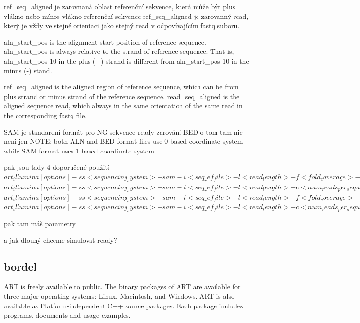 \documentclass[czech,DP]{thesiskiv}
\begin{document}
		ref\_seq\_aligned je zarovnaná oblast referenční sekvence, která může být plus vlákno nebo mínos vlákno referenční sekvence
		ref\_seq\_aligned je zarovanný read, který je vždy ve stejné orientaci jako stejný read v odpovívajícím fastq suboru.  
		
		
			    
	    
	       	
		aln\_start\_pos is the alignment start position of reference sequence. aln\_start\_pos is always relative to the strand of reference sequence. That is, aln\_start\_pos 10 in the plus (+) strand is different from aln\_start\_pos 10 in the minus (‐) stand.  
	
		ref\_seq\_aligned is the aligned region of reference sequence, which can be from plus strand or minus strand of the reference sequence. 
		read\_seq\_aligned is the aligned sequence read, which always in the same orientation of the same read in the corresponding fastq file. 

SAM je standardní formát pro NG sekvence ready zarování
BED o tom tam nic neni jen 
NOTE: both ALN and BED format files use 0-based coordinate system while SAM format uses 1-based coordinate system.

pak jsou tady 4 doporučené použití
$art_illumina [options] -ss <sequencing_system> -sam -i <seq_ref_file> -l <read_length> -f <fold_coverage> -o <outfile_prefix>$
$art_illumina [options] -ss <sequencing_system> -sam -i <seq_ref_file> -l <read_length> -c <num_reads_per_sequence> -o <outfile_prefix>$
$art_illumina [options] -ss <sequencing_system> -sam -i <seq_ref_file> -l <read_length> -f <fold_coverage> -m <mean_fragsize> -s <std_fragsize> -o <outfile_prefix>$
$art_illumina [options] -ss <sequencing_system> -sam -i <seq_ref_file> -l <read_length> -c <num_reads_per_sequence> -m <mean_fragsize> -s <std_fragsize> -o <outfile_prefix>$

pak tam máš parametry 

a jak dlouhý chceme simulovat ready? 



\subsection{bordel}
ART is freely available to public. The binary packages of ART are available for three major operating systems: Linux, Macintosh, and Windows. ART is also available as Platform-independent C++ source packages. Each package includes programs, documents and usage examples.
\end{document}
